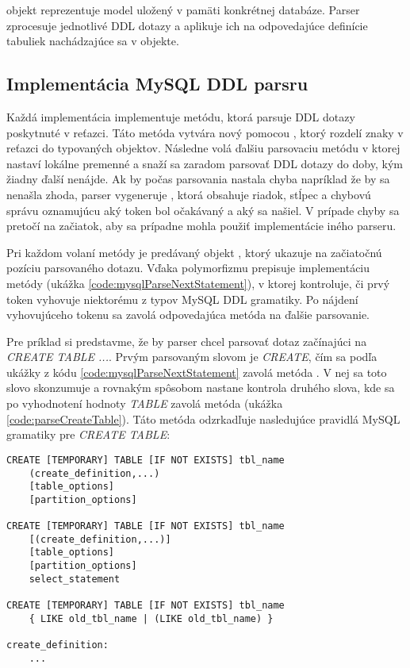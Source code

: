  objekt reprezentuje model uložený v pamäti konkrétnej databáze. Parser zprocesuje jednotlivé DDL dotazy a aplikuje ich na odpovedajúce definície tabuliek nachádzajúce sa v  objekte.

\subsection{Implementácia MySQL DDL parsru}
Každá implementácia  implementuje metódu, ktorá parsuje DDL dotazy poskytnuté v reťazci. Táto metóda vytvára nový  pomocou , ktorý rozdelí znaky v reťazci do typovaných  objektov. Následne volá ďalšiu parsovaciu metódu v ktorej nastaví lokálne premenné a snaží sa zaradom parsovať DDL dotazy do doby, kým žiadny ďalší nenájde. Ak by počas parsovania nastala chyba napríklad že by sa nenašla zhoda, parser vygeneruje , ktorá obsahuje riadok, stĺpec a chybovú správu oznamujúcu aký token bol očakávaný a aký sa našiel. V prípade chyby sa  pretočí na začiatok, aby sa prípadne mohla použiť implementácie iného parseru.

Pri každom volaní metódy  je predávaný objekt , ktorý ukazuje na začiatočnú pozíciu parsovaného dotazu. Vďaka polymorfizmu  prepisuje implementáciu  metódy (ukážka \ref{code:mysqlParseNextStatement}), v ktorej kontroluje, či prvý token vyhovuje niektorému z typov MySQL DDL gramatiky. Po nájdení vyhovujúceho tokenu sa zavolá odpovedajúca metóda na ďalšie parsovanie. 

Pre príklad si predstavme, že by parser chcel parsovať dotaz začínajúci na \textit{CREATE TABLE ...}. Prvým parsovaným slovom je \textit{CREATE}, čím sa podľa ukážky z kódu \ref{code:mysqlParseNextStatement} zavolá metóda . V nej sa toto slovo skonzumuje a rovnakým spôsobom nastane kontrola druhého slova, kde sa po vyhodnotení hodnoty \textit{TABLE} zavolá metóda  (ukážka \ref{code:parseCreateTable}). Táto metóda odzrkadľuje nasledujúce pravidlá MySQL gramatiky pre \textit{\mbox{CREATE} TABLE}:
\newline
\begin{lstlisting}[language=MySQL, frame=none, numbers=none]
CREATE [TEMPORARY] TABLE [IF NOT EXISTS] tbl_name
    (create_definition,...)
    [table_options]
    [partition_options]

CREATE [TEMPORARY] TABLE [IF NOT EXISTS] tbl_name
    [(create_definition,...)]
    [table_options]
    [partition_options]
    select_statement

CREATE [TEMPORARY] TABLE [IF NOT EXISTS] tbl_name
    { LIKE old_tbl_name | (LIKE old_tbl_name) }

create_definition:
    ...
\end{lstlisting}


